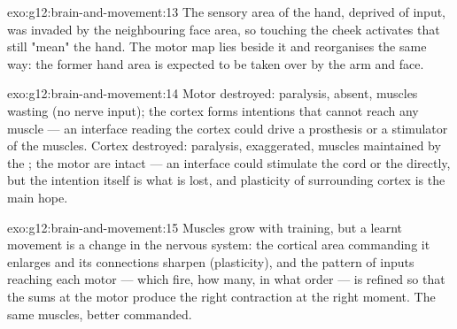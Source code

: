 \begin{solution}{exo:g12:brain-and-movement:13}
The sensory area of the hand, deprived of input, was invaded by the
neighbouring face area, so touching the cheek activates  that
still "mean" the hand. The motor map lies beside it and reorganises
the same way: the former hand area is expected to be taken over by the
arm and face.
\end{solution}

\begin{solution}{exo:g12:brain-and-movement:14}
Motor  destroyed: paralysis,  absent, muscles wasting
(no nerve input); the cortex forms intentions that cannot reach any
muscle --- an interface reading the cortex could drive a prosthesis
or a stimulator of the muscles. Cortex destroyed: paralysis, 
exaggerated, muscles maintained by the ; the motor  are
intact --- an interface could stimulate the cord or the 
directly, but the intention itself is what is lost, and plasticity of
surrounding cortex is the main hope.
\end{solution}

\begin{solution}{exo:g12:brain-and-movement:15}
Muscles grow with training, but a learnt movement is a change in the
nervous system: the cortical area commanding it enlarges and its
connections sharpen (plasticity), and the pattern of inputs reaching
each motor  --- which fire, how many, in what order --- is
refined so that the sums at the motor  produce the right
contraction at the right moment. The same muscles, better commanded.
\end{solution}

